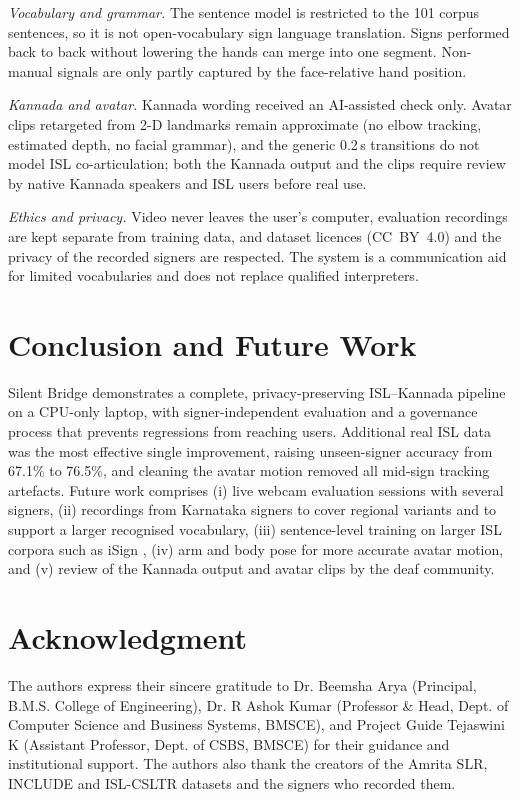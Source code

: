 \documentclass[conference]{IEEEtran}
\begin{document}
\textit{Vocabulary and grammar.} The sentence model is restricted to the 101 corpus sentences, so it is not open-vocabulary sign language translation. Signs performed back to back without lowering the hands can merge into one segment. Non-manual signals are only partly captured by the face-relative hand position.

\textit{Kannada and avatar.} Kannada wording received an AI-assisted check only. Avatar clips retargeted from 2-D landmarks remain approximate (no elbow tracking, estimated depth, no facial grammar), and the generic 0.2\,s transitions do not model ISL co-articulation; both the Kannada output and the clips require review by native Kannada speakers and ISL users before real use.

\textit{Ethics and privacy.} Video never leaves the user's computer, evaluation recordings are kept separate from training data, and dataset licences (CC~BY~4.0) and the privacy of the recorded signers are respected. The system is a communication aid for limited vocabularies and does not replace qualified interpreters.

\section{Conclusion and Future Work}
Silent Bridge demonstrates a complete, privacy-preserving ISL--Kannada pipeline on a CPU-only laptop, with signer-independent evaluation and a governance process that prevents regressions from reaching users. Additional real ISL data was the most effective single improvement, raising unseen-signer accuracy from 67.1\% to 76.5\%, and cleaning the avatar motion removed all mid-sign tracking artefacts. Future work comprises (i) live webcam evaluation sessions with several signers, (ii) recordings from Karnataka signers to cover regional variants and to support a larger recognised vocabulary, (iii) sentence-level training on larger ISL corpora such as iSign \cite{joshi2024isign}, (iv) arm and body pose for more accurate avatar motion, and (v) review of the Kannada output and avatar clips by the deaf community.

\section*{Acknowledgment}
The authors express their sincere gratitude to Dr. Beemsha Arya (Principal, B.M.S. College of Engineering), Dr. R Ashok Kumar (Professor \& Head, Dept. of Computer Science and Business Systems, BMSCE), and Project Guide Tejaswini K (Assistant Professor, Dept. of CSBS, BMSCE) for their guidance and institutional support. The authors also thank the creators of the Amrita SLR, INCLUDE and ISL-CSLTR datasets and the signers who recorded them.
\end{document}
